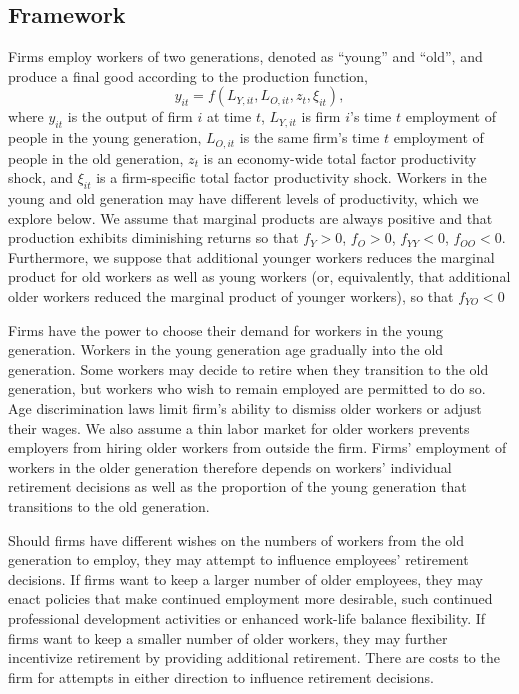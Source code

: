 \documentclass[11pt]{article}
\newcommand{\beq}{\begin{equation}}
\newcommand{\eeq}{\end{equation}}
\begin{document}
\subsection{Framework}
Firms employ workers of two generations, denoted as ``young'' and ``old'', and produce a final good according to the production function,
\beq y_{it} =  f\left( L_{Y,it}, L_{O,it}, z_t, \xi_{it} \right), \eeq
where $y_{it}$ is the output of firm $i$ at time $t$, $L_{Y,it}$ is firm $i$'s time $t$ employment of people in the young generation, $L_{O,it}$ is the same firm's time $t$ employment of people in the old generation, $z_t$ is an economy-wide total factor productivity shock, and $\xi_{it}$ is a firm-specific total factor productivity shock. Workers in the young and old generation may have different levels of productivity, which we explore below. We assume that marginal products are always positive and that production exhibits diminishing returns so that $f_Y>0$, $f_O>0$, $f_{YY}<0$, $f_{OO}<0$. Furthermore, we suppose that additional younger workers reduces the marginal product for old workers as well as young workers (or, equivalently, that additional older workers reduced the marginal product of younger workers), so that $f_{YO}<0$

Firms have the power to choose their demand for workers in the young generation. Workers in the young generation age gradually into the old generation. Some workers may decide to retire when they transition to the old generation, but workers who wish to remain employed are permitted to do so. Age discrimination laws limit firm's ability to dismiss older workers or adjust their wages. We also assume a thin labor market for older workers prevents employers from hiring older workers from outside the firm. Firms' employment of workers in the older generation therefore depends on workers' individual retirement decisions as well as the proportion of the young generation that transitions to the old generation.

Should firms have different wishes on the numbers of workers from the old generation to employ, they may attempt to influence employees' retirement decisions. If firms want to keep a larger number of older employees, they may enact policies that make continued employment more desirable, such continued professional development activities or enhanced work-life balance flexibility. If firms want to keep a smaller number of older workers, they may further incentivize retirement by providing additional retirement. There are costs to the firm for attempts in either direction to influence retirement decisions.
\end{document}
